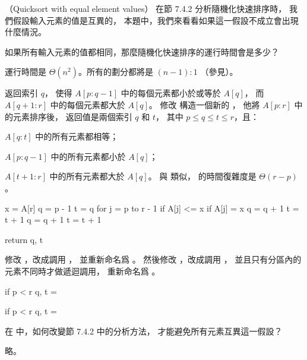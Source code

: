 （Quicksort with equal element values）
在節 7.4.2 分析隨機化快速排序時，
我們假設輸入元素的值是互異的，
本題中，我們來看看如果這一假設不成立會出現什麼情況。
\startigBase[a]
\item 如果所有輸入元素的值都相同，那麼隨機化快速排序的運行時間會是多少？
\stopigBase

\startANSWER
運行時間是 $\Theta(n^2)$。所有的劃分都將是 $(n-1):1$
 （參見）。
\stopANSWER

\startigBase[a,continue]
\item {} 返回索引 $q$，
使得 $A[p:q-1]$ 中的每個元素都小於或等於 $A[q]$，
而 $A[q+1:r]$ 中的每個元素都大於 $A[q]$。
修改  構造一個新的 ，
他將 $A[p:r]$ 中的元素排序後，
返回值是兩個索引 $q$ 和 $t$，
其中 $p\le q\le t\le r$，且：
\startigBase
\item $A[q:t]$ 中的所有元素都相等；
\item $A[p:q-1]$ 中的所有元素都小於 $A[q]$；
\item $A[t+1:r]$ 中的所有元素都大於 $A[q]$。
\stopigBase
與  類似，  的時間復雜度是 $\Theta(r-p)$。
\stopigBase

\startANSWER
{}
\startCLRSCODE
x = A[r]
q = p - 1
t = q
for j = p to r - 1
	if A[j] <= x
		if A[j] = x
			q = q + 1
		t = t + 1
q = q + 1
t = t + 1

return q, t
\stopCLRSCODE
\stopANSWER

\startigBase[a,continue]
\item 修改 ，改成調用 ，
並重新命名爲 。
然後修改 ，改成調用 ，
並且只有分區內的元素不同時才做遞迴調用，
重新命名爲 。
\stopigBase

\startANSWER
{}
\startCLRSCODE
if p < r
	q, t = 
\stopCLRSCODE

\startCLRSCODE
if p < r
	q, t = 
\stopCLRSCODE
\stopANSWER

\startigBase[a,continue]
\item 在  中，如何改變節 7.4.2 中的分析方法，
才能避免所有元素互異這一假設？
\stopigBase

\startANSWER
略。
\stopANSWER
\stopPROBLEM
